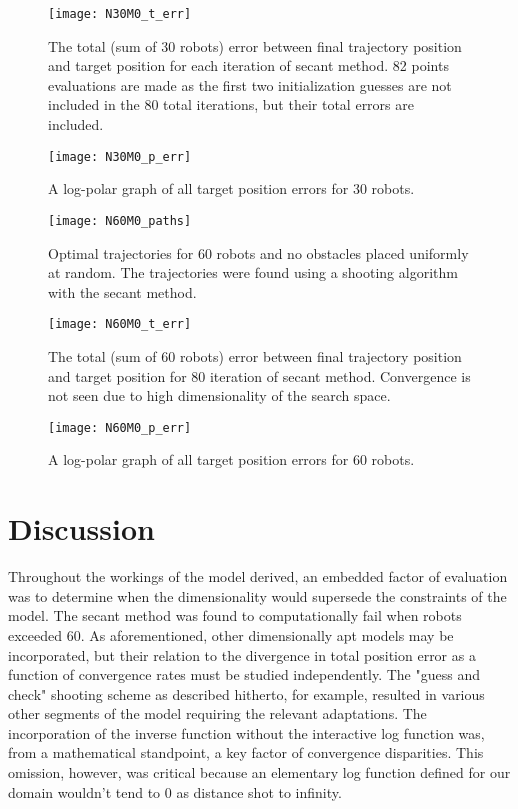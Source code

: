 \documentclass[11pt]{article}
\begin{document}
\begin{figure}
	\centering
	\texttt{[image: N30M0\_t\_err]}
	\caption{The total (sum of 30 robots) error between final trajectory position and target position for each iteration of secant method. 82 points evaluations are made as the first two initialization guesses are not included in the 80 total iterations, but their total errors are included.}
	\label{fig:n30m0-t-err}
\end{figure}

\begin{figure}
	\centering
	\texttt{[image: N30M0\_p\_err]}
	\caption{A log-polar graph of all target position errors for 30 robots.}
	\label{fig:n30m0-p-err}
\end{figure}

\begin{figure}
	\centering
	\texttt{[image: N60M0\_paths]}
	\caption{Optimal trajectories for 60 robots and no obstacles placed uniformly at random. The trajectories were found using a shooting algorithm with the secant method.}
	\label{fig:n60m0-paths}
\end{figure}

\begin{figure}
	\centering
	\texttt{[image: N60M0\_t\_err]}
	\caption{The total (sum of 60 robots) error between final trajectory position and target position for 80 iteration of secant method. Convergence is not seen due to high dimensionality of the search space.}
	\label{fig:n60m0-t-err}
\end{figure}

\begin{figure}
	\centering
	\texttt{[image: N60M0\_p\_err]}
	\caption{A log-polar graph of all target position errors for 60 robots.}
	\label{fig:n60m0-p-err}
\end{figure}

\section{Discussion}

Throughout the workings of the model derived, an embedded factor of evaluation was to determine when the dimensionality would supersede the constraints of the model. The secant method was found to computationally fail when robots exceeded 60. As aforementioned, other dimensionally apt models may be incorporated, but their relation to the divergence in total position error as a function of convergence rates must be studied independently. The "guess and check" shooting scheme as described hitherto, for example, resulted in various other segments of the model requiring the relevant adaptations. The incorporation of the inverse function without the interactive log function was, from a mathematical standpoint, a key factor of convergence disparities. This omission, however, was critical because an elementary log function defined for our domain wouldn't tend to 0 as distance shot to infinity. 
\end{document}
